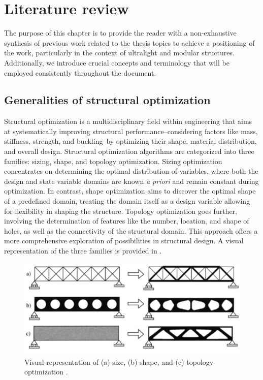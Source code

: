 \setchapterpreamble[u]{\margintoc}
\glsresetall %

\chapter{Literature review} \label{chap:02}
The purpose of this chapter is to provide the reader with a non-exhaustive synthesis of previous work related to the thesis topics to achieve a positioning of the work, particularly in the context of ultralight and modular structures. Additionally, we introduce crucial concepts and terminology that will be employed consistently throughout the document.

\section{Generalities of structural optimization}
Structural optimization is a multidisciplinary field within engineering that aims at systematically improving structural performance--considering factors like mass, stiffness, strength, and buckling--by optimizing their shape, material distribution, and overall design. Structural optimization algorithms are categorized into three families: sizing, shape, and topology optimization. Sizing optimization concentrates on determining the optimal distribution of variables, where both the design and state variable domains are known \textit{a priori} and remain constant during optimization. In contrast, shape optimization aims to discover the optimal shape of a predefined domain, treating the domain itself as a design variable allowing for flexibility in shaping the structure. Topology optimization goes further, involving the determination of features like the number, location, and shape of holes, as well as the connectivity of the structural domain. This approach offers a more comprehensive exploration of possibilities in structural design. A visual representation of the three families is provided in .

\begin{figure}
    \centering
    \includegraphics[width=\linewidth]{figures/02_literature/opt_family.png}
    \caption{Visual representation of (a) size, (b) shape, and (c) topology optimization \cite{bendsoe_topology_2004}.}
    \label{fig:02_opt_fam}
\end{figure}

